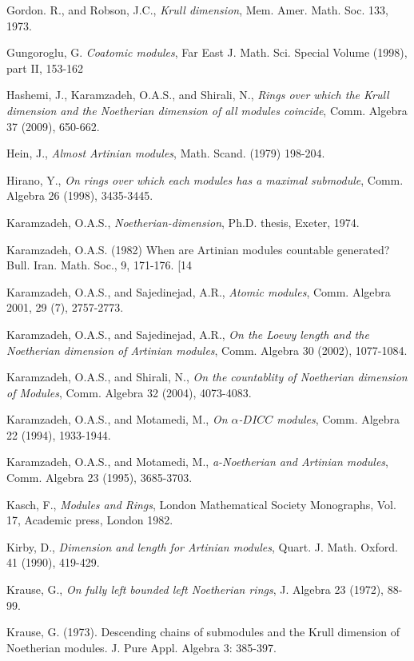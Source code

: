 \begin{thebibliography}{47}
Gordon. R., and Robson, J.C., {\it Krull dimension}, Mem. Amer. Math. Soc. 133, 1973.
 
Gungoroglu, G. {\it Coatomic modules}, Far East J. Math. Sci. Special Volume (1998), part  II, 153-162

Hashemi, J., Karamzadeh, O.A.S., and Shirali, N., {\it Rings over
which the Krull dimension and the Noetherian dimension of all
modules coincide}, Comm. Algebra 37 (2009), 650-662.

Hein, J., {\it Almost Artinian modules}, Math. Scand. (1979) 198-204.

Hirano, Y., {\it On rings over which each modules has a maximal submodule}, Comm. Algebra 26 (1998), 3435-3445.

Karamzadeh, O.A.S., {\it Noetherian-dimension}, Ph.D. thesis, Exeter, 1974.

Karamzadeh, O.A.S. (1982) When are Artinian modules countable generated? Bull.
Iran. Math. Soc., 9, 171-176.
[14

Karamzadeh, O.A.S., and Sajedinejad, A.R., {\it Atomic modules},
Comm. Algebra 2001, 29 (7), 2757-2773.

Karamzadeh, O.A.S., and Sajedinejad, A.R., {\it On the Loewy length and the
Noetherian dimension of Artinian modules}, Comm. Algebra 30 (2002), 1077-1084.


Karamzadeh, O.A.S., and Shirali, N., {\it On the countablity of Noetherian dimension of Modules}, Comm. Algebra 32 (2004), 4073-4083.


Karamzadeh, O.A.S., and Motamedi, M., {\it On $\alpha$-$DICC$ modules},
Comm. Algebra 22 (1994), 1933-1944.

Karamzadeh, O.A.S., and Motamedi, M., {\it a-Noetherian and Artinian modules},
Comm. Algebra 23 (1995), 3685-3703.


Kasch, F., {\it Modules and Rings}, London Mathematical Society Monographs, Vol. 17, Academic press, London 1982.


Kirby, D., {\it Dimension and length for Artinian modules}, Quart.
J. Math. Oxford. 41 (1990), 419-429.

Krause, G., {\it On fully left bounded left Noetherian rings}, J. Algebra 23 (1972), 88-99.

Krause, G. (1973). Descending chains of submodules and the Krull dimension of
Noetherian modules. J. Pure Appl. Algebra 3: 385-397.


\end{thebibliography}
